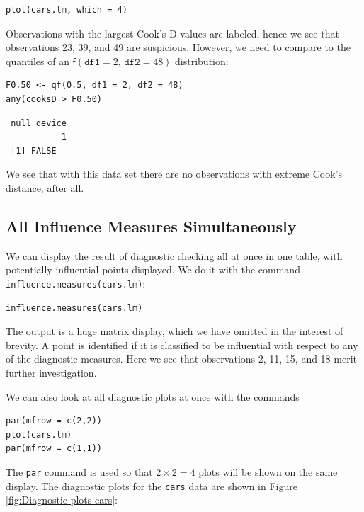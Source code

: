 \documentclass[captions=tableheading]{scrbook}
\begin{document}
\begin{verbatim}
plot(cars.lm, which = 4)
\end{verbatim}

Observations with the largest Cook's D values are labeled, hence we see that observations 23, 39, and 49 are suspicious. However, we need to compare to the quantiles of an \( \mathsf{f}(\mathtt{df1} = 2, \, \mathtt{df2} = 48) \) distribution:


\begin{verbatim}
F0.50 <- qf(0.5, df1 = 2, df2 = 48)
any(cooksD > F0.50)
\end{verbatim}

\begin{verbatim}
 null device 
           1
 [1] FALSE
\end{verbatim}

We see that with this data set there are no observations with extreme Cook's distance, after all.
\subsection{All Influence Measures Simultaneously}
\label{sec-11-5-5}


We can display the result of diagnostic checking all at once in one table, with potentially influential points displayed. We do it with the command \texttt{influence.measures(cars.lm)}:


\begin{verbatim}
influence.measures(cars.lm)
\end{verbatim}

The output is a huge matrix display, which we have omitted in the interest of brevity. A point is identified if it is classified to be influential with respect to any of the diagnostic measures. Here we see that observations 2, 11, 15, and 18 merit further investigation.  

We can also look at all diagnostic plots at once with the commands


\begin{verbatim}
par(mfrow = c(2,2))
plot(cars.lm)
par(mfrow = c(1,1))
\end{verbatim}

The \texttt{par} command is used so that \(2\times 2 = 4\) plots will be shown on the same display. The diagnostic plots for the \texttt{cars} data are shown in Figure \ref{fig:Diagnostic-plots-cars}:
\end{document}
